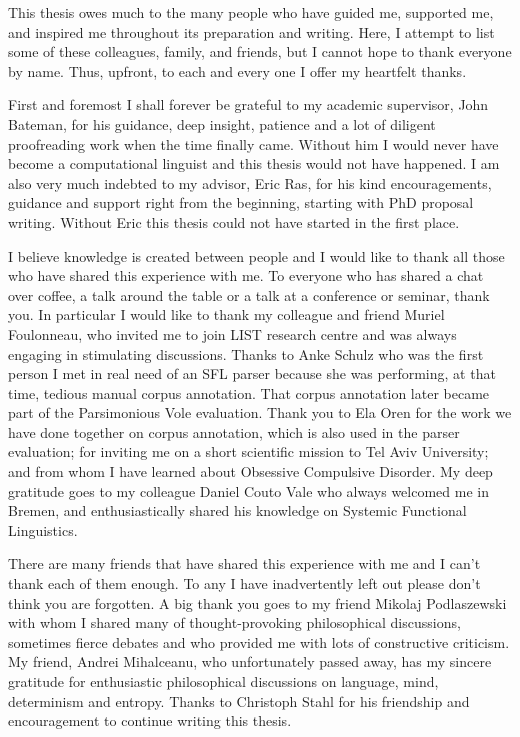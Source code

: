 
\begin{acknowledgements}      

This thesis owes much to the many people who have guided me, supported me, and inspired me throughout its preparation and writing. Here, I attempt to list some of these colleagues, family, and friends, but I cannot hope to thank everyone by name. Thus, upfront, to each and every one I offer my heartfelt thanks.

First and foremost I shall forever be grateful to my academic supervisor, John Bateman, for his guidance, deep insight, patience and a lot of diligent proofreading work when the time finally came. Without him I would never have become a computational linguist and this thesis would not have happened. I am also very much indebted to my advisor, Eric Ras, for his kind encouragements, guidance and support right from the beginning, starting with PhD proposal writing. Without Eric this thesis could not have started in the first place. 

I believe knowledge is created between people and I would like to thank all those who have shared this experience with me. To everyone who has shared a chat over coffee, a talk around the table or a talk at a conference or seminar, thank you. In particular I would like to thank my colleague and friend Muriel Foulonneau, who invited me to join LIST research centre and was always engaging in stimulating discussions. Thanks to Anke Schulz who was the first person I met in real need of an SFL parser because she was performing, at that time, tedious manual corpus annotation. That corpus annotation later became part of the Parsimonious Vole evaluation. Thank you to Ela Oren for the work we have done together on corpus annotation, which is also used in the parser evaluation; for inviting me on a short scientific mission to Tel Aviv University; and from whom I have learned about Obsessive Compulsive Disorder. My deep gratitude goes to my colleague Daniel Couto Vale who always welcomed me in Bremen, and enthusiastically shared his knowledge on Systemic Functional Linguistics. 

There are many friends that have shared this experience with me and I can't thank each of them enough. To any I have inadvertently left out please don't think you are forgotten. A big thank you goes to my friend Mikolaj Podlaszewski with whom I shared many of thought-provoking philosophical discussions, sometimes fierce debates and who provided me with lots of constructive criticism. My friend, Andrei Mihalceanu, who unfortunately passed away, has my sincere gratitude for enthusiastic philosophical discussions on language, mind, determinism and entropy. Thanks to Christoph Stahl for his friendship and encouragement to continue writing this thesis. 


\end{acknowledgements}
